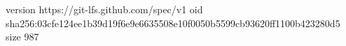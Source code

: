 version https://git-lfs.github.com/spec/v1
oid sha256:03cfe124ee1b39d19f6e9e6635508e10f0050b5599cb93620ff1100b423280d5
size 987
